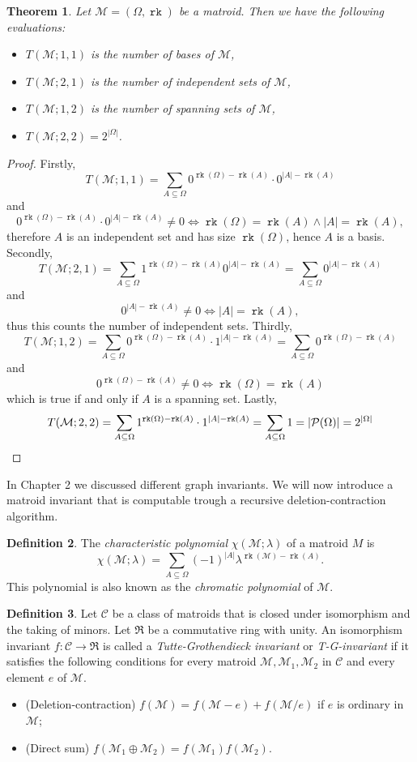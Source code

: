 \documentclass[12pt,a4paper, twoside, autooneside=false]{scrartcl}
\newtheorem{theorem}{Theorem}[section]
\theoremstyle{definition}
\newtheorem{definition}[theorem]{Definition}
\theoremstyle{remark}
\numberwithin{equation}{section}
\DeclareMathOperator{\rk}{\mathtt{rk}}
\newcommand{\M}{\mathcal{M}} %
\begin{document}
\begin{theorem}
Let $\M = (\Omega, \rk)$ be a matroid. Then we have the following evaluations:
\begin{itemize}
\item[1.] $T(\M; 1,1)$ is the number of bases of $\M$, 
\item[2.] $T(\M;2,1)$ is the number of independent sets of $\M$, 
\item[3.] $T(\M;1,2)$ is the number of spanning sets of $\M$, 
\item[4.] $T(\M;2,2) = 2^{|\Omega|}$.
\end{itemize}
\end{theorem}
\begin{proof}
Firstly,\[
T(\M;1 ,1 ) = \sum_{A \subseteq \Omega} 0^{\rk(\Omega) - \rk(A)}\cdot 0^{|A| - \rk(A)}
\]
and 
\[
0^{\rk(\Omega) - \rk(A)}\cdot 0^{|A| - \rk(A)} \neq 0 \Longleftrightarrow \rk(\Omega) = \rk(A) \wedge |A| = \rk(A),\] 
therefore $A$ is an independent set and has size $\rk(\Omega)$, hence $A$ is a basis. 
Secondly, 
\[
T(\M; 2,1) = \sum_{A \subseteq \Omega} 1^{\rk(\Omega) - \rk(A)} 0^{|A| - \rk(A)} = \sum_{A \subseteq \Omega} 0^{|A| - \rk(A)}
\]
and
\[0^{|A| - \rk(A)} \neq 0 \Longleftrightarrow |A| = \rk(A)
,\] thus this counts the number of independent sets. 
Thirdly, \[
T(\M; 1,2) = \sum_{A \subseteq \Omega} 0^{\rk(\Omega) - \rk(A)}\cdot 1^{|A| - \rk(A)} = \sum_{A \subseteq \Omega}0^{\rk(\Omega) - \rk(A)} 
\]and 
\[
0^{\rk(\Omega) - \rk(A)} \neq 0 \Longleftrightarrow \rk(\Omega) = \rk(A)
\] which is true if and only if $A$ is a spanning set. 
Lastly, 
\[
T(\M; 2,2) = \sum_{A \subseteq \Omega} 1^{\rk(\Omega) - \rk(A)} \cdot 1^{|A| - \rk(A)} = \sum_{A \subseteq \Omega} 1 = |\mathcal{P}(\Omega)| = 2^{|\Omega|} \qedhere
\]
\end{proof}
In Chapter 2 we discussed different graph invariants. We will now introduce a matroid invariant that is computable trough a recursive deletion-contraction algorithm. 
\begin{definition}
The \textit{characteristic polynomial} $\chi(\M; \lambda)$ of a matroid $M$ is 
\[
\chi(\M; \lambda) = \sum_{A \subseteq \Omega} (-1)^{|A|} \lambda^{\rk(\M) - \rk(A)}.
\] 
This polynomial is also known as the \textit{chromatic polynomial} of $\M$.
\end{definition}
\begin{definition}
Let $\mathcal{C}$ be a class of matroids that is closed under isomorphism and the taking of minors. Let $\mathfrak{R}$ be a commutative ring with unity. An isomorphism invariant $f: \mathcal{C} \to \mathfrak{R}$ is called a \textit{Tutte-Grothendieck invariant} or \textit{T-G-invariant} if it satisfies the following conditions for every matroid $\M, \M_1, \M_2$ in $\mathcal{C}$ and every element $e$ of $\M$. 
\begin{itemize}
\item[1)] (Deletion-contraction) $f(\M) = f(\M - e) + f(\M / e)$ if $e$ is ordinary in $\M$;
\item[2)] (Direct sum) $f(\M_1 \oplus \M_2) = f(\M_1)f(\M_2)$.
\end{itemize} 
\end{definition} 
\end{document}
